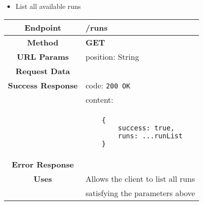     \begin{itemize}
            \item List all available runs
        \end{itemize}
        \begin{adjustwidth}{1cm}{}
            \begin{longtable}{|c|l|}
                \hline
                \textbf{Endpoint} & /runs \\
                \hline
                \textbf{Method} & \textbf{GET} \\
                \hline
                \textbf{URL Params} &  position:  String \\
                \hline
                \textbf{Request Data} &  \\
                \hline
                \textbf{Success Response} & code: \texttt{200 OK} \\
                &                           content: \\
                & \begin{minipage}[t]{0.5\textwidth}
                    \begin{adjustwidth}{1.5cm}{}
                    \begin{verbatim}
    {
        success: true, 
        runs: ...runList
    }
                    \end{verbatim}
                    \end{adjustwidth}
                  \end{minipage} \\
                  \hline
                \textbf{Error Response} & \\
                  \hline
                \textbf{Uses} & Allows the client to list all runs\\ 
                              &  satisfying the parameters above \\
                \hline
            \end{longtable}
        \end{adjustwidth}
    
